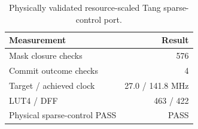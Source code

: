 \begin{table}[t]
\centering
\caption{Physically validated resource-scaled Tang sparse-control port.}
\label{tab:tang-sparse-control-candidate}
\begin{tabular}{lr}
\hline
Measurement & Result \\
\hline
Mask closure checks & 576 \\
Commit outcome checks & 4 \\
Target / achieved clock & 27.0 / 141.8 MHz \\
LUT4 / DFF & 463 / 422 \\
Physical sparse-control PASS & PASS \\
\hline
\end{tabular}
\end{table}
